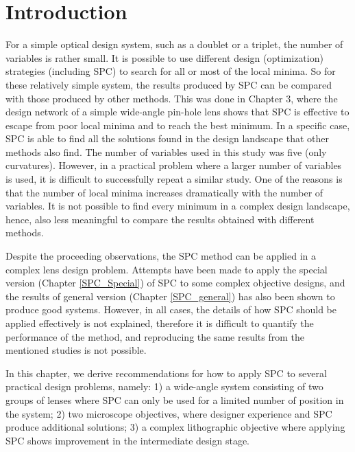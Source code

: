 \section{Introduction}
For a simple optical design system, such as a doublet or a triplet, the number of variables is rather small. It is possible to use different design (optimization) strategies (including SPC) to search for all or most of the local minima. So for these relatively simple system, the results produced by SPC can be compared with those produced by other methods. This was done in Chapter 3, where the design network of a simple wide-angle pin-hole lens \cite{HouSimple16} shows that SPC is effective to escape from poor local minima and to reach the best minimum. In a specific case, SPC is able to find all the solutions found in the design landscape that other methods also find. The number of variables used in this study was five (only curvatures). However, in a practical problem where a larger number of variables is used, it is difficult to successfully repeat a similar study. One of the reasons is that the number of local minima increases dramatically with the number of variables. It is not possible to find every minimum in a complex design landscape, hence, also less meaningful to compare the results obtained with different methods.  

Despite the proceeding observations, the SPC method can be applied in a complex lens design problem. Attempts have been made to apply the special version (Chapter \ref{SPC_Special}) of SPC to some complex objective designs\cite{OanaOEngPart2}\cite{CaoCatadioptricwithSPCOeng2017}, and the results of general version (Chapter \ref{SPC_general}) has also been shown to produce good systems\cite{LivshitsSP2014}. However, in all cases, the details of how SPC should be applied effectively is not explained, therefore it is difficult to quantify the performance of the method, and reproducing the same results from the mentioned studies is not possible. 

In this chapter, we derive recommendations for how to apply SPC to several practical design problems, namely: 1) a wide-angle system consisting of two groups of lenses where SPC can only be used for a limited number of position in the system; 2) two microscope objectives, where designer experience and SPC produce additional solutions; 3) a complex lithographic objective where applying SPC shows improvement in the intermediate design stage. 


